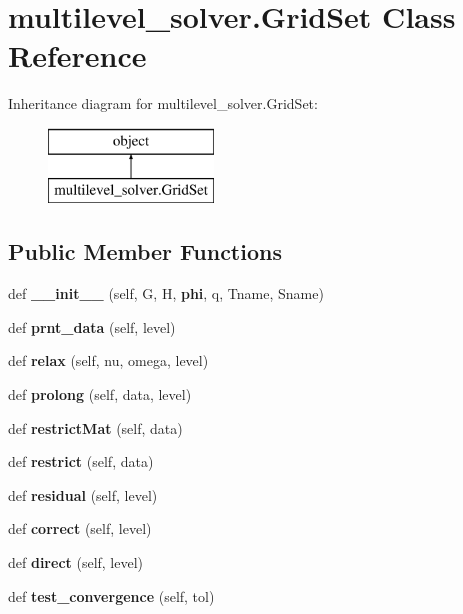 \section{multilevel\+\_\+solver.\+Grid\+Set Class Reference}
\label{classmultilevel__solver_1_1_grid_set}
Inheritance diagram for multilevel\+\_\+solver.\+Grid\+Set\+:\begin{figure}[H]
\begin{center}
\leavevmode
\includegraphics[height=2.000000cm]{classmultilevel__solver_1_1_grid_set}
\end{center}
\end{figure}
\subsection*{Public Member Functions}
\begin{DoxyCompactItemize}
\item 
def {\bfseries \+\_\+\+\_\+init\+\_\+\+\_\+} (self, G, H, {\bf phi}, q, Tname, Sname)\label{classmultilevel__solver_1_1_grid_set_ac67e7da7d78fd54e3a857877fc773244}

\item 
def {\bf prnt\+\_\+data} (self, level)
\item 
def {\bfseries relax} (self, nu, omega, level)\label{classmultilevel__solver_1_1_grid_set_a8421870f0278c6412b7894ecd9f1f25b}

\item 
def {\bf prolong} (self, data, level)
\item 
def {\bfseries restrict\+Mat} (self, data)\label{classmultilevel__solver_1_1_grid_set_af6c66f05d5e7e874b6e1b00a4958b1eb}

\item 
def {\bfseries restrict} (self, data)\label{classmultilevel__solver_1_1_grid_set_a0680fd0c22a8b46eed0f3d8de7af5488}

\item 
def {\bfseries residual} (self, level)\label{classmultilevel__solver_1_1_grid_set_a22f0050c0f960551869b255b2397f7a4}

\item 
def {\bfseries correct} (self, level)\label{classmultilevel__solver_1_1_grid_set_a5ed53041596e0d9185b14d0e3af1b2c9}

\item 
def {\bfseries direct} (self, level)\label{classmultilevel__solver_1_1_grid_set_a9c8925fc58196c7944cb068030dbd908}

\item 
def {\bfseries test\+\_\+convergence} (self, tol)\label{classmultilevel__solver_1_1_grid_set_ab90a9e459b5dcfbf9d2c3b8826e5e318}

\end{DoxyCompactItemize}
